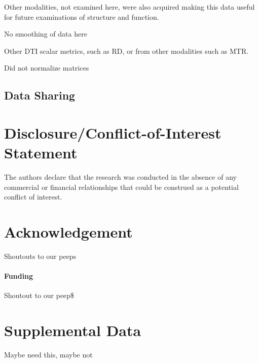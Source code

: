 \documentclass{frontiersSCNS} %
\begin{document}
Other modalities, not examined here,
were also acquired making this data useful for future examinations of
structure and function.

No smoothing of data here

Other DTI scalar metrics, such as RD, or from other modalities such as MTR.

Did not normalize matrices

\subsection{Data Sharing}

\section*{Disclosure/Conflict-of-Interest Statement}
The authors declare that the research was conducted in the absence of any commercial or financial relationships that could be construed as a potential conflict of interest.

\section*{Acknowledgement}
Shoutouts to our peeps

\paragraph{Funding\textcolon} Shoutout to our peep\$

\section*{Supplemental Data}
Maybe need this, maybe not
\end{document}
